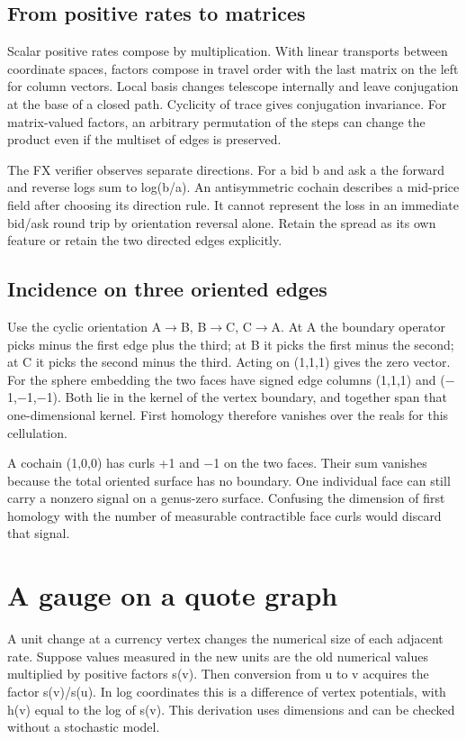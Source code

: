 \documentclass[11pt,oneside,openany]{book}
\begin{document}
\section*{From positive rates to matrices}
Scalar positive rates compose by multiplication. With linear transports between coordinate spaces, factors compose in travel order with the last matrix on the left for column vectors. Local basis changes telescope internally and leave conjugation at the base of a closed path. Cyclicity of trace gives conjugation invariance. For matrix-valued factors, an arbitrary permutation of the steps can change the product even if the multiset of edges is preserved.

The FX verifier observes separate directions. For a bid b and ask a the forward and reverse logs sum to log(b/a). An antisymmetric cochain describes a mid-price field after choosing its direction rule. It cannot represent the loss in an immediate bid/ask round trip by orientation reversal alone. Retain the spread as its own feature or retain the two directed edges explicitly.

\section*{Incidence on three oriented edges}
Use the cyclic orientation A\ensuremath{\to}B, B\ensuremath{\to}C, C\ensuremath{\to}A. At A the boundary operator picks minus the first edge plus the third; at B it picks the first minus the second; at C it picks the second minus the third. Acting on (1,1,1) gives the zero vector. For the sphere embedding the two faces have signed edge columns (1,1,1) and (\ensuremath{-}1,\ensuremath{-}1,\ensuremath{-}1). Both lie in the kernel of the vertex boundary, and together span that one-dimensional kernel. First homology therefore vanishes over the reals for this cellulation.

A cochain (1,0,0) has curls +1 and \ensuremath{-}1 on the two faces. Their sum vanishes because the total oriented surface has no boundary. One individual face can still carry a nonzero signal on a genus-zero surface. Confusing the dimension of first homology with the number of measurable contractible face curls would discard that signal.

\chapter{A gauge on a quote graph}
A unit change at a currency vertex changes the numerical size of each adjacent rate. Suppose values measured in the new units are the old numerical values multiplied by positive factors s(v). Then conversion from u to v acquires the factor s(v)/s(u). In log coordinates this is a difference of vertex potentials, with h(v) equal to the log of s(v). This derivation uses dimensions and can be checked without a stochastic model.
\end{document}
